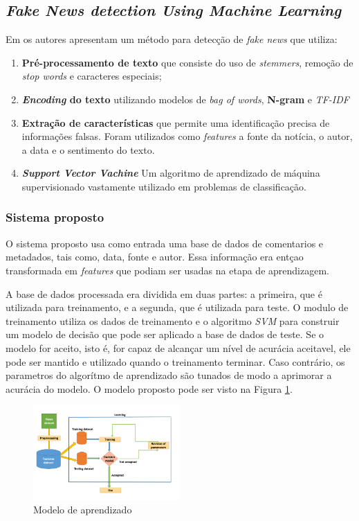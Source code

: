 \subsection{\textit{Fake News detection Using Machine Learning}}

Em \cite{baarir2020} os autores apresentam um método para detecção de \textit{fake news} que utiliza: \\

\begin{enumerate}
    \item \textbf{Pré-processamento de texto} que consiste do uso de \textit{stemmers}, remoção de \textit{stop words} e caracteres especiais;
    \item \textbf{\textit{Encoding} do texto} utilizando modelos de \textit{bag of words}, \textbf{N-gram} e \textit{TF-IDF}
    \item \textbf{Extração de características} que permite uma identificação precisa de informações falsas. Foram utilizados como \textit{features} a fonte da notícia, o autor, a data e o sentimento do texto.
    \item \textbf{\textit{Support Vector Vachine}} Um algoritmo de aprendizado de máquina supervisionado vastamente utilizado em problemas de classificação.
\end{enumerate}


\subsubsection{Sistema proposto}

O sistema proposto usa como entrada uma base de dados de comentarios e metadados, tais como, data, fonte e autor. Essa informação era entçao transformada em \textit{features} que podiam ser usadas na etapa de aprendizagem. 

A base de dados processada era dividida em duas partes: a primeira, que é utilizada para treinamento, e a segunda, que é utilizada para teste. O modulo de treinamento utiliza os dados de treinamento e o algoritmo \textit{SVM} para construir um modelo de decisão que pode ser aplicado a base de dados de teste. Se o modelo for aceito, isto é, for capaz de alcançar um nível de acurácia aceitavel, ele pode ser mantido e utilizado quando o treinamento terminar. Caso contrário, os parametros do algorítmo de aprendizado são tunados de modo a aprimorar a acurácia do modelo. O modelo proposto pode ser visto na Figura \ref{fig:mesh1}.

\begin{figure}[h]
    \centering
    \includegraphics[width=0.5\textwidth]{Imagens/revisao informal/modelo1.png}
    \caption{Modelo de aprendizado}
    \label{fig:mesh1}
\end{figure}



